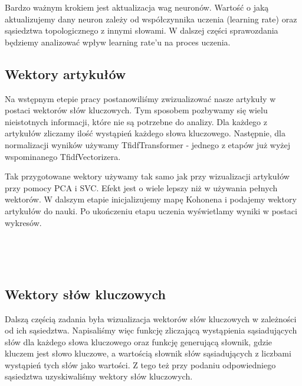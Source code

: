 \documentclass[11pt]{article}
\begin{document}
Bardzo ważnym krokiem jest aktualizacja wag neuronów. Wartość o jaką aktualizujemy 
dany neuron zależy od współczynnika uczenia (learning rate) oraz sąsiedztwa topologicznego
z innymi słowami. W dalszej części sprawozdania będziemy analizować wpływ learning rate’u
na proces uczenia.

\subsection*{Wektory artykułów}

Na wstępnym etepie pracy postanowiliśmy zwizualizować nasze artykuły w postaci wektorów słów kluczowych.
Tym sposobem pozbywamy się wielu nieistotnych informacji, które nie są potrzebne do analizy.
Dla każdego z artykułów zliczamy ilość wystąpień każdego słowa kluczowego. Następnie, dla 
normalizacji wyników używamy TfidfTransformer - jednego z etapów już wyżej wspominanego TfidfVectorizera.

Tak przygotowane wektory używamy tak samo jak przy wizualizacji artykułów przy pomocy PCA i SVC.
Efekt jest o wiele lepszy niż w używania pełnych wektorów.
W dalszym etapie inicjalizujemy mapę Kohonena i podajemy wektory artykułów do nauki.
Po ukończeniu etapu uczenia wyświetlamy wyniki w postaci wykresów.

    \begin{center}
    \end{center}
    { \hspace*{\fill} \\}

    \begin{center}
    \end{center}
    { \hspace*{\fill} \\}
    
\subsection*{Wektory słów kluczowych}

Dalszą częścią zadania była wizualizacja wektorów słów kluczowych w zależności od ich sąsiedztwa.
Napisaliśmy więc funkcję zliczającą wystąpienia sąsiadujących słów dla każdego 
słowa kluczowego oraz funkcję generującą słownik, gdzie kluczem jest słowo kluczowe, 
a wartością słownik słów sąsiadujących z liczbami wystąpień tych słów jako wartości.
Z tego też przy podaniu odpowiedniego sąsiedztwa uzyskiwaliśmy wektory słów kluczowych.
\end{document}
